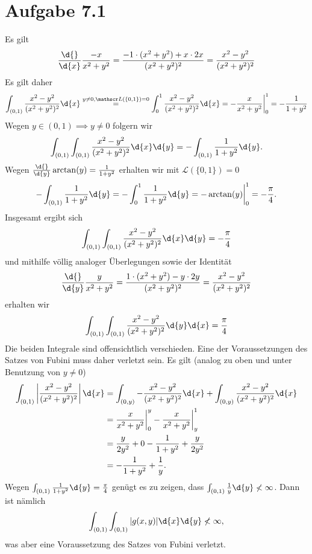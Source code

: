 \documentclass{article}
\begin{document}
\def\headheight{25pt}
    \section*{Aufgabe 7.1}
    Es gilt
    \[
        \frac{\d{}}{\d{x}}\frac{-x}{x^2 + y^2} = \frac{-1\cdot(x^2 + y^2) +x\cdot 2x}{(x^2 + y^2)^2} = \frac{x^2 - y^2}{(x^2 + y^2)^2}
    \]
    Es gilt daher
    \[
        \int_{(0,1)} \frac{x^2 - y^2}{(x^2 + y^2)^2} \d{x} \overset{y\neq 0, \mathscr L(\{0,1\}) = 0}{=} \int_0^1  \frac{x^2 - y^2}{(x^2 + y^2)^2} \d{x} = - \frac{x}{x^2 + y^2} \bigg|_0^1 = -\frac{1}{1 + y^2}
    \]
    Wegen $y \in (0,1) \implies y \neq 0$ folgern wir
    \[
        \int_{(0,1)} \int_{(0,1)} \frac{x^2 - y^2}{(x^2 + y^2)^2} \d{x} \d{y} = - \int_{(0,1)} \frac{1}{1 + y^2} \d{y}.
    \]
    Wegen $\frac{\d{}}{\d{y}} \arctan(y) = \frac{1}{1 + y^2}$ erhalten wir mit $\mathscr L(\{0,1\}) = 0$
    \[
        - \int_{(0,1)} \frac{1}{1 + y^2} \d{y} = - \int_0^1 \frac{1}{1 + y^2} \d{y} = - \arctan(y)\bigg|_0^1 = - \frac{\pi}{4}.
    \]
    Insgesamt ergibt sich
    \[
        \int_{(0,1)} \int_{(0,1)} \frac{x^2 - y^2}{(x^2 + y^2)^2} \d{x} \d{y} = - \frac{\pi}{4}
    \]
    und mithilfe völlig analoger Überlegungen sowie der Identität
    \[
        \frac{\d{}}{\d{y}}\frac{y}{x^2 + y^2} = \frac{1\cdot(x^2 + y^2) -y\cdot 2y}{(x^2 + y^2)^2} = \frac{x^2 - y^2}{(x^2 + y^2)^2}
    \]
    erhalten wir
    \[
        \int_{(0,1)} \int_{(0,1)} \frac{x^2 - y^2}{(x^2 + y^2)^2} \d{y} \d{x} = \frac{\pi}{4}
    \]
    Die beiden Integrale sind offensichtlich verschieden. Eine der Voraussetzungen des Satzes von Fubini muss daher verletzt sein.
    Es gilt (analog zu oben und unter Benutzung von $y \neq 0$)
    \begin{align*}
        \int_{(0,1)} \left|\frac{x^2 - y^2}{(x^2 + y^2)^2}\right|\d{x} &= \int_{(0,y)} - \frac{x^2 - y^2}{(x^2 + y^2)^2} \d{x} + \int_{(0,y)} \frac{x^2 - y^2}{(x^2 + y^2)^2} \d{x}\\
        &= \frac{x}{x^2 + y^2}\bigg|_0^y - \frac{x}{x^2 + y^2}\bigg|_y^1\\
        &= \frac{y}{2y^2} + 0 - \frac{1}{1+y^2} + \frac{y}{2y^2}\\
        &= - \frac{1}{1 + y^2} + \frac{1}{y}.
    \end{align*}
    Wegen $\int_{(0,1)} \frac{1}{1 + y^2} \d{y} = \frac{\pi}{4}$ genügt es zu zeigen, dass $\int_{(0,1)} \frac{1}{y} \d{y} \not < \infty$. Dann ist nämlich
    \[
        \int_{(0,1)}  \int_{(0,1)} |g(x,y)| \d{x} \d{y} \not < \infty,
    \] was aber eine Voraussetzung des Satzes von Fubini verletzt.
\end{document}
